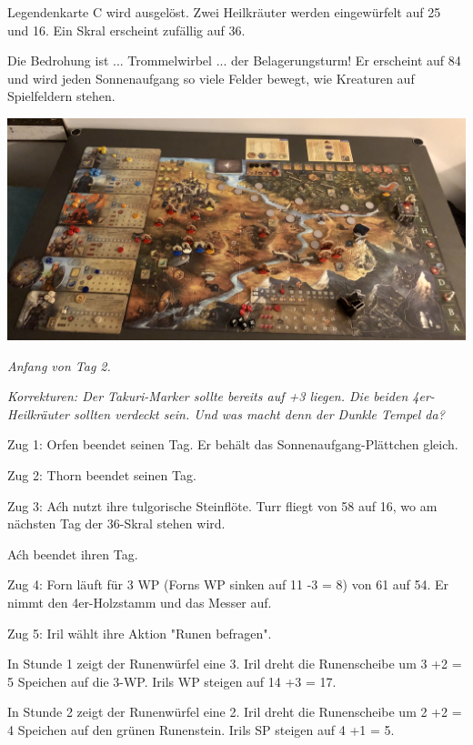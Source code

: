 \documentclass[10pt, a4paper, oneside]{book}
\begin{document}
{Legendenkarte C wird ausgelöst. Zwei Heilkräuter werden eingewürfelt auf 25 und 16. Ein Skral erscheint zufällig auf 36.

Die Bedrohung ist ... Trommelwirbel ... der Belagerungsturm! Er erscheint auf 84 und wird jeden Sonnenaufgang so viele Felder bewegt, wie Kreaturen auf Spielfeldern stehen.\bigskip


\includegraphics[width=\textwidth]{Das Erbe des Wunderkindes/Bilder/Tag 2 Anfang.jpg}


\textit{Anfang von Tag 2.}

\textit{Korrekturen: Der Takuri-Marker sollte bereits auf +3 liegen. Die beiden 4er-Heilkräuter sollten verdeckt sein. Und was macht denn der Dunkle Tempel da?}\bigskip




Zug 1: Orfen beendet seinen Tag. Er behält das Sonnenaufgang-Plättchen gleich.



Zug 2: Thorn beendet seinen Tag.



Zug 3: Aćh nutzt ihre tulgorische Steinflöte. Turr fliegt von 58 auf 16, wo am nächsten Tag der 36-Skral stehen wird.

Aćh beendet ihren Tag.



Zug 4: Forn läuft für 3 WP (Forns WP sinken auf 11 -3 = 8) von 61 auf 54. Er nimmt den 4er-Holzstamm und das Messer auf.



Zug 5: Iril wählt ihre Aktion "Runen befragen".

In Stunde 1 zeigt der Runenwürfel eine 3. Iril dreht die Runenscheibe um 3 +2 = 5 Speichen auf die 3-WP. Irils WP steigen auf 14 +3 = 17.

In Stunde 2 zeigt der Runenwürfel eine 2. Iril dreht die Runenscheibe um 2 +2 = 4 Speichen auf den grünen Runenstein. Irils SP steigen auf 4 +1 = 5.

}
\end{document}

